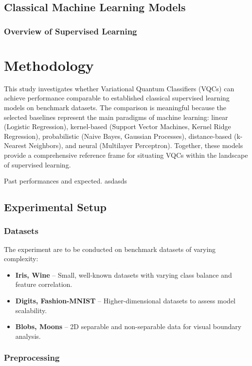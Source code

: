 \section{Classical Machine Learning Models}

\subsection{Overview of Supervised Learning}

\chapter{Methodology}
\label{chap:methodology}
This study investigates whether Variational Quantum Classifiers (VQCs) can achieve performance comparable to established classical supervised learning models on benchmark datasets. The comparison is meaningful because the selected baselines represent the main paradigms of machine learning: linear (Logistic Regression), kernel-based (Support Vector Machines, Kernel Ridge Regression), probabilistic (Naive Bayes, Gaussian Processes), distance-based (k-Nearest Neighbors), and neural (Multilayer Perceptron). Together, these models provide a comprehensive reference frame for situating VQCs within the landscape of supervised learning.



Past performances and expected. asdasds

\section{Experimental Setup}
\label{sec:setup}

\subsection{Datasets}
The experiment are to be conducted on benchmark datasets of varying complexity:
\begin{itemize}
    \item \textbf{Iris, Wine} – Small, well-known datasets with varying class balance and feature correlation.
    \item \textbf{Digits, Fashion-MNIST } – Higher-dimensional datasets to assess model scalability.
    \item \textbf{Blobs, Moons} – 2D separable and non-separable data for visual boundary analysis.
\end{itemize}

\subsection{Preprocessing}

